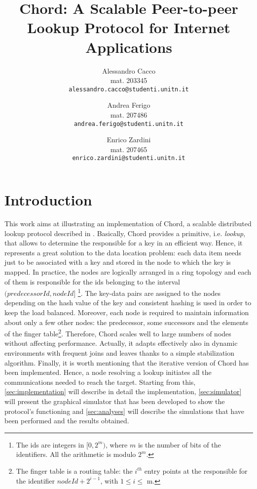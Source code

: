 \documentclass[11pt,twocolumn,letterpaper]{article}
\begin{document}
	
	\title{Chord: A Scalable Peer-to-peer Lookup Protocol for Internet Applications}
	
	\author{Alessandro Cacco\\
		mat. 203345\\
		{\tt\small alessandro.cacco@studenti.unitn.it}
		\and
		Andrea Ferigo\\
		mat. 207486\\
		{\tt\small andrea.ferigo@studenti.unitn.it}
		\and
		Enrico Zardini\\
		mat. 207465\\
		{\tt\small enrico.zardini@studenti.unitn.it}
	}
	\date{}
	\maketitle
	
	\section{Introduction}
	\label{sec:intro}
	This work aims at illustrating an implementation of Chord, a scalable distributed lookup protocol described in \cite{chord}. Basically, Chord provides a primitive, i.e. \textit{lookup}, that allows to determine the responsible for a key in an efficient way. Hence, it represents a great solution to the data location problem: each data item needs just to be associated with a key and stored in the node to which the key is mapped. \newline 
	In practice, the nodes are logically arranged in a ring topology and each of them is responsible for the ids belonging to the interval $(predecessorId, nodeId]$ \footnote{The ids are integers in $[0,2^m)$, where $m$ is the number of bits of the identifiers. All the arithmetic is modulo $2^m$.}. The key-data pairs are assigned to the nodes depending on the hash value of the key and consistent hashing is used in order to keep the load balanced. Moreover, each node is required to maintain information about only a few other nodes: the predecessor, some successors and the elements of the finger table\footnote{The finger table is a routing table: the $i^{th}$ entry points at the responsible for the identifier $nodeId+2^{i-1}$, with $1\leq i \leq$ m.}. Therefore, Chord scales well to large numbers of nodes without affecting performance. Actually, it adapts effectively also in dynamic environments with frequent joins and leaves thanks to a simple stabilization algorithm. \newline
	Finally, it is worth mentioning that the iterative version of Chord has been implemented. Hence, a node resolving a lookup initiates all the communications needed to reach the target. \newline
	Starting from this, \cref{sec:implementation} will describe in detail the implementation, \cref{sec:simulator} will present the graphical simulator that has been developed to show the protocol's functioning and \cref{sec:analyses} will describe the simulations that have been performed and the results obtained. 
	
\end{document}

